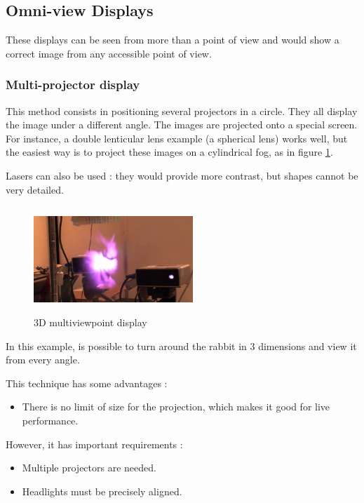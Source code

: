 \subsection{Omni-view Displays}
These displays can be seen from more than a point of view and would show a correct image from any accessible point of view.

\subsubsection{Multi-projector display}
This method consists in positioning several projectors in a circle. They all display the image under a different angle. The images are projected onto a special screen. For instance, a double lenticular lens example (a spherical lens) works well, but the easiest way is to project these images on a cylindrical fog, as in figure \ref{fig:cilfog}.

Lasers can also be used : they would provide more contrast, but shapes cannot be very detailed.

\begin{figure}[h!]
\centering\includegraphics[width=6cm,height=4cm]{image/lapin.png}
\caption{3D multiviewpoint display}
\label{fig:cilfog}
\end{figure}

In this example, is possible to turn around the rabbit in 3 dimensions and view it from every angle.

This technique has some advantages : 
\begin{itemize}
\item There is no limit of size for the projection, which makes it good for live performance.
\end{itemize}

However, it has important requirements : 
\begin{itemize}
\item Multiple projectors are needed.
\item Headlights must be precisely aligned.
\end{itemize}

